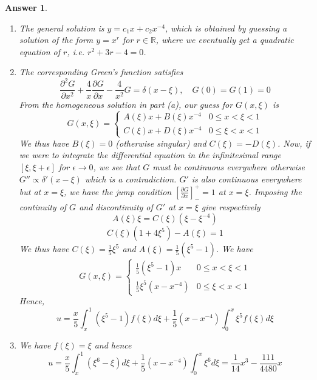 \documentclass[a4paper]{article}
\newtheorem{ans}{Answer}[section]
\theoremstyle{new}
\begin{document}
\begin{ans}\leavevmode
\begin{enumerate}[label=(\alph*)]
\item The general solution is $y=c_1x+c_2x^{-4}$, which is obtained by guessing a solution of the form $y=x^r$ for $r\in\mathbb{R}$, where we eventually get a quadratic equation of $r$, i.e. $r^2+3r-4=0$.
\item The corresponding Green's function satisfies
$$\frac{\partial^2G}{\partial x^2}+\frac{4}{x}\frac{\partial G}{\partial x}-\frac{4}{x^2}G=\delta(x-\xi),\quad G(0)=G(1)=0$$
From the homogeneous solution in part (a), our guess for $G(x,\xi)$ is 
$$G(x,\xi)=
\left\{
        \begin{array}{ll}
      A(\xi)x+B(\xi)x^{-4} & 0\leq x<\xi<1 \\
      C(\xi)x+D(\xi)x^{-4} & 0\leq\xi<x<1
        \end{array}
    \right.$$
We thus have $B(\xi)=0$ (otherwise singular) and $C(\xi)=-D(\xi)$. Now, if we were to integrate the differential equation in the infinitesimal range $[\xi,\xi+\epsilon]$ for $\epsilon\rightarrow 0$, we see that $G$ must be continuous everywhere otherwise $G''\propto\delta'(x-\xi)$ which is a contradiction. $G'$ is also continuous everywhere but at $x=\xi$, we have the jump condition $[\frac{\partial G}{\partial x}]_-^+=1$ at $x=\xi$. Imposing the continuity of $G$ and discontinuity of $G'$ at $x=\xi$ give respectively
$$A(\xi)\xi=C(\xi)(\xi-\xi^{-4})$$
$$C(\xi)(1+4\xi^5)-A(\xi)=1$$
We thus have $C(\xi)=\frac{1}{5}\xi^5$ and $A(\xi)=\frac{1}{5}(\xi^5-1)$. We have 
$$G(x,\xi)=
\left\{
        \begin{array}{ll}
      \frac{1}{5}(\xi^5-1)x & 0\leq x<\xi<1 \\
      \frac{1}{5}\xi^5(x-x^{-4}) & 0\leq\xi<x<1
        \end{array}
    \right.$$
Hence,
$$u=\frac{x}{5}\int_x^1(\xi^5-1)f(\xi)d\xi+\frac{1}{5}(x-x^{-4})\int_0^x\xi^5f(\xi)d\xi$$
\item We have $f(\xi)=\xi$ and hence
$$u=\frac{x}{5}\int_x^1(\xi^6-\xi)d\xi+\frac{1}{5}(x-x^{-4})\int_0^x\xi^6d\xi=\frac{1}{14}x^3-\frac{111}{4480}x$$
\end{enumerate}
\end{ans}
\newpage
\end{document}

